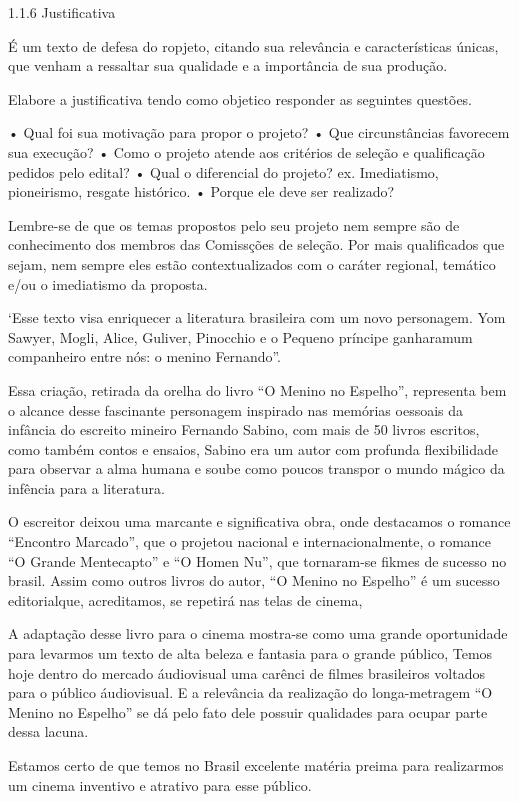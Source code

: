 1.1.6 Justificativa 

É um texto de defesa do ropjeto, citando sua relevância e características únicas, que venham a ressaltar sua qualidade e a importância de sua produção.

Elabore a justificativa tendo como objetico responder as seguintes questões.

    • Qual foi sua motivação para propor o projeto?
    • Que circunstâncias favorecem sua execução?
    • Como o projeto atende aos critérios de seleção e qualificação pedidos pelo edital?
    • Qual o diferencial do projeto? ex. Imediatismo, pioneirismo, resgate histórico.
    • Porque ele deve ser realizado?

Lembre-se de que os temas propostos pelo seu projeto nem sempre são de conhecimento dos membros das Comissções de seleção. Por mais qualificados que sejam, nem sempre eles estão contextualizados com o caráter regional, temático e/ou o imediatismo da proposta.

‘Esse texto visa enriquecer a literatura brasileira com um novo personagem. Yom Sawyer, Mogli, Alice, Guliver, Pinocchio e o Pequeno príncipe ganharamum companheiro entre nós: o menino Fernando”.

Essa criação, retirada da orelha do livro “O Menino no Espelho”, representa bem o alcance desse fascinante personagem inspirado nas memórias oessoais da infância do escreito mineiro Fernando Sabino, com mais de 50 livros escritos, como também contos e ensaios, Sabino era um autor com profunda flexibilidade para observar a alma humana e soube como poucos transpor o mundo mágico da infência para a literatura.

O escreitor deixou uma marcante e significativa obra, onde destacamos o romance “Encontro Marcado”, que o projetou nacional e internacionalmente, o romance “O Grande Mentecapto” e “O Homen Nu”, que tornaram-se fikmes de sucesso no brasil. Assim como outros livros do autor, “O Menino no Espelho” é um sucesso editorialque, acreditamos, se repetirá nas telas de cinema,

A adaptação desse livro para o cinema mostra-se como uma grande oportunidade para levarmos um texto de alta beleza e fantasia para o grande público, Temos hoje dentro do mercado áudiovisual uma carênci de filmes brasileiros voltados para o público áudiovisual. E a relevância da realização do longa-metragem “O Menino no Espelho” se dá pelo fato dele possuir qualidades para ocupar parte dessa lacuna. 

Estamos certo de que temos no Brasil excelente matéria preima para realizarmos um cinema inventivo e atrativo para esse público.

